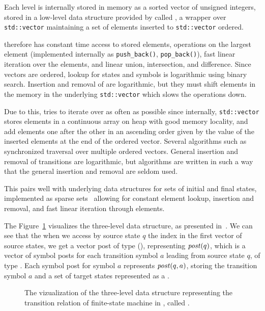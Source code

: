 Each level is internally stored in memory as a sorted vector of unsigned integers, stored in a low-level data structure provided by \mata called \ordvector, a wrapper over \texttt{std::vector} maintaining a set of elements inserted to \texttt{std::vector} ordered.

\ordvector therefore has constant time access to stored elements, operations on the largest element (implemented internally as \texttt{push\_back()}, \texttt{pop\_back()}), fast linear iteration over the elements, and linear union, intersection, and difference.
Since vectors are ordered, lookup for states and symbols is logarithmic using binary search.
Insertion and removal of are logarithmic, but they must shift elements in the memory in the underlying \texttt{std::vector} which slows the operations down.

Due to this, \mata tries to iterate over \ordvector as often as possible since internally, \texttt{std::vector} stores elements in a continuous array on heap with good memory locality, and add elements one after the other in an ascending order given by the value of the inserted elements at the end of the ordered vector.
Several algorithms such as synchronized traversal over multiple ordered vectors.
General insertion and removal of transitions are logarithmic, but \mata algorithms are written in such a way that the general insertion and removal are seldom used.

This pairs well with underlying data structures for sets of initial and final states, implemented as sparse sets~\cite{sparseset93} allowing for constant element lookup, insertion and removal, and fast linear iteration through elements.

The Figure~\ref{fig:delta_struct} visualizes the three-level \deltastruct data structure, as presented in~\cite{tacas24_mata_10.1007/978-3-031-57249-4_7}. We can see that the when we access by source state $q$ the index in the first vector of source states, we get a vector post of type \statepost (\statepost[q]), representing $\mathit{post}(q)$, which is a vector of symbol posts for each transition symbol $a$ leading from source state $q$, of type \symbolpost.
Each symbol post for symbol $a$ represents $\mathit{post}(q, a)$, storing the transition symbol $a$ and a set of target states represented as a \ordvector.

\begin{figure}[ht]
  \centering
  \resizebox{0.6\textwidth}{!}{%
    
  }
\caption{
The vizualization of the three-level data structure representing the transition relation of finite-state machine in \mata, called \deltastruct.
}
\label{fig:delta_struct}
\end{figure}

